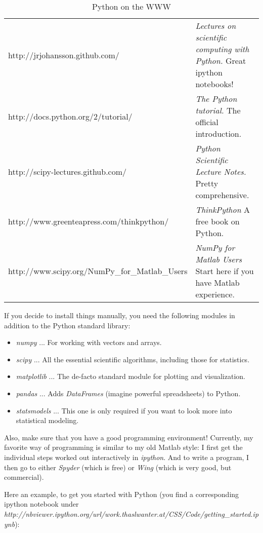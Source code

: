 \begin{table}

  \footnotesize{
  \centering
   \begin{tabular}{|l p{10 cm}|}
     \hline
     http://jrjohansson.github.com/ & \emph{Lectures on scientific computing with Python.} Great ipython notebooks! \\     http://docs.python.org/2/tutorial/ & \emph{The Python tutorial.} The official introduction. \\
     http://scipy-lectures.github.com/ & \emph{Python Scientific Lecture Notes.} Pretty comprehensive. \\
     http://www.greenteapress.com/thinkpython/ & \emph{ThinkPython} A free book on Python. \\
     http://www.scipy.org/NumPy\_for\_Matlab\_Users & \emph{NumPy for Matlab Users} Start here if you have Matlab experience. \\
     \hline
   \end{tabular}
   }
  \caption{Python on the WWW}\label{table:python}
\end{table}

If you decide to install things manually, you need the following modules in addition to the Python standard library:

\begin{itemize}
  \item \emph{numpy} ... For working with vectors and arrays.
  \item \emph{scipy} ... All the essential scientific algorithms, including those for statistics.
  \item \emph{matplotlib} ... The de-facto standard module for plotting and visualization.
  \item \emph{pandas} ... Adds \emph{DataFrames} (imagine powerful spreadsheets) to Python.
  \item \emph{statsmodels} ... This one is only required if you want to look more into statistical modeling.
\end{itemize}

Also, make sure that you have a good programming environment! Currently, my favorite way of programming is similar to my old Matlab style: I first get the individual steps worked out interactively in \emph{ipython}. And to write a program, I then go to either \emph{Spyder} (which is free) or \emph{Wing} (which is very good, but commercial).

Here an example, to get you started with Python (you find a corresponding ipython notebook under \emph{http://nbviewer.ipython.org/url/work.thaslwanter.at/CSS/Code/getting\_started.ipynb}):


